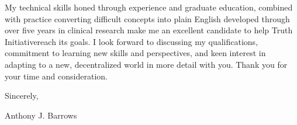 \documentclass[letterpaper,11pt]{article}
\newcommand{\company}{Truth Initiative}
\begin{document}
	
	My technical skills honed through experience and graduate education, combined with practice converting difficult concepts into plain English developed through over five years in clinical research make me an excellent candidate to help \company \space reach its goals. I look forward to discussing my qualifications, commitment to learning new skills and perspectives, and keen interest in adapting to a new, decentralized world in more detail with you. Thank you for your time and consideration.
	
	\vspace{5mm}
	
	Sincerely,
	\vspace{3mm}
	
	Anthony J. Barrows
\end{document}
